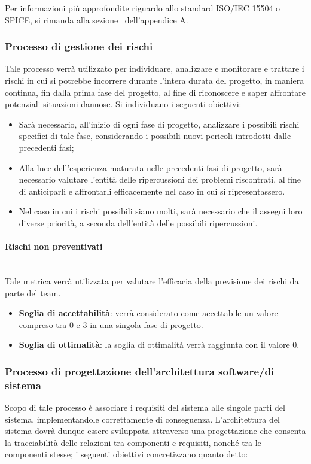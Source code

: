 Per informazioni più approfondite riguardo allo standard ISO/IEC 15504 o SPICE, si rimanda alla sezione~ dell'appendice A.

\subsubsection{Processo di gestione dei rischi}
Tale processo verrà utilizzato per individuare, analizzare e monitorare e trattare i rischi in cui si potrebbe incorrere durante l’intera durata del progetto, in maniera continua, fin dalla prima fase del progetto, al fine di riconoscere e saper affrontare potenziali situazioni dannose.
Si individuano i seguenti obiettivi:

\begin{itemize}
	\item Sarà necessario, all'inizio di ogni fase di progetto, analizzare i possibili rischi specifici di tale fase, considerando i possibili nuovi pericoli introdotti dalle precedenti fasi;	
	\item Alla luce dell'esperienza maturata nelle precedenti fasi di progetto, sarà necessario valutare l'entità delle ripercussioni dei problemi riscontrati, al fine di anticiparli e affrontarli efficacemente nel caso in cui si ripresentassero.
	\item Nel caso in cui i rischi possibili siano molti, sarà necessario che il \Res assegni loro diverse priorità, a seconda dell'entità delle possibili ripercussioni.
\end{itemize}

\paragraph{Rischi non preventivati}
~\\Tale metrica verrà utilizzata per valutare l'efficacia della previsione dei rischi da parte del team.

\begin{itemize}
	\item \textbf{Soglia di accettabilità}: verrà considerato come accettabile un valore compreso tra 0 e 3 in una singola fase di progetto.
	\item \textbf{Soglia di ottimalità}: la soglia di ottimalità verrà raggiunta con il valore 0.
\end{itemize}


\subsubsection{Processo di progettazione dell'architettura software/di sistema}
Scopo di tale processo è associare i requisiti del sistema alle singole parti del sistema, implementandole correttamente di conseguenza. L'architettura del sistema dovrà dunque essere sviluppata attraverso una progettazione che consenta la tracciabilità delle relazioni tra componenti e requisiti, nonché tra le componenti stesse; i seguenti obiettivi concretizzano quanto detto:

